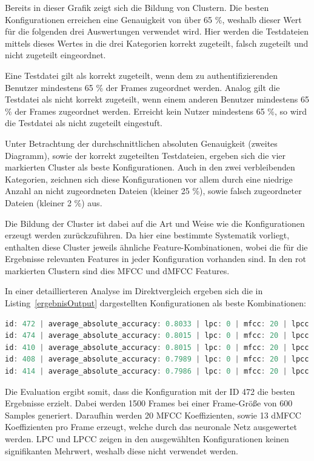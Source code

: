 Bereits in dieser Grafik zeigt sich die Bildung von Clustern.
Die besten Konfigurationen erreichen eine Genauigkeit von über 65 \%, weshalb dieser Wert für die folgenden drei Auswertungen verwendet wird.
Hier werden die Testdateien mittels dieses Wertes in die drei Kategorien korrekt zugeteilt, falsch zugeteilt und nicht zugeteilt eingeordnet.

Eine Testdatei gilt als korrekt zugeteilt, wenn dem zu authentifizierenden Benutzer mindestens 65 \% der Frames zugeordnet werden.
Analog gilt die Testdatei als nicht korrekt zugeteilt, wenn einem anderen Benutzer mindestens 65 \% der Frames zugeordnet werden.
Erreicht kein Nutzer mindestens 65 \%, so wird die Testdatei als nicht zugeteilt eingestuft.

Unter Betrachtung der durchschnittlichen absoluten Genauigkeit (zweites Diagramm), sowie der korrekt zugeteilten Testdateien, ergeben sich die vier markierten Cluster als beste Konfigurationen.
Auch in den zwei verbleibenden Kategorien, zeichnen sich diese Konfigurationen vor allem durch eine niedrige Anzahl an nicht zugeordneten Dateien (kleiner 25 \%), sowie falsch zugeordneter Dateien (kleiner 2 \%) aus.

Die Bildung der Cluster ist dabei auf die Art und Weise wie die Konfigurationen erzeugt werden zurückzuführen.
Da hier eine bestimmte Systematik vorliegt, enthalten diese Cluster jeweils ähnliche Feature-Kombinationen, wobei die für die Ergebnisse relevanten Features in jeder Konfiguration vorhanden sind.
In den rot markierten Clustern sind dies \ac{MFCC} und \ac{dMFCC} Features.

In einer detaillierteren Analyse im Direktvergleich ergeben sich die in Listing~\ref{ergebnisOutput} dargestellten Konfigurationen als beste Kombinationen:
\begin{lstlisting}[language=JavaScript,numbers=none,caption=Auswertung der Konfigurationen,label=ergebnisOutput]
id: 472 | average_absolute_accuracy: 0.8033 | lpc: 0 | mfcc: 20 | lpcc:  0 | delta_mfcc: 13
id: 474 | average_absolute_accuracy: 0.8015 | lpc: 0 | mfcc: 20 | lpcc: 13 | delta_mfcc: 13
id: 410 | average_absolute_accuracy: 0.8015 | lpc: 0 | mfcc: 20 | lpcc: 13 | delta_mfcc: 13
id: 408 | average_absolute_accuracy: 0.7989 | lpc: 0 | mfcc: 20 | lpcc:  0 | delta_mfcc: 13
id: 414 | average_absolute_accuracy: 0.7986 | lpc: 0 | mfcc: 20 | lpcc: 13 | delta_mfcc: 13
\end{lstlisting}

Die Evaluation ergibt somit, dass die Konfiguration mit der ID 472 die besten Ergebnisse erzielt.
Dabei werden 1500 Frames bei einer Frame-Größe von 600 Samples generiert.
Daraufhin werden 20 \ac{MFCC} Koeffizienten, sowie 13 \ac{dMFCC} Koeffizienten pro Frame erzeugt, welche durch das neuronale Netz ausgewertet werden.
\ac{LPC} und \ac{LPCC} zeigen in den ausgewählten Konfigurationen keinen signifikanten Mehrwert, weshalb diese nicht verwendet werden.

